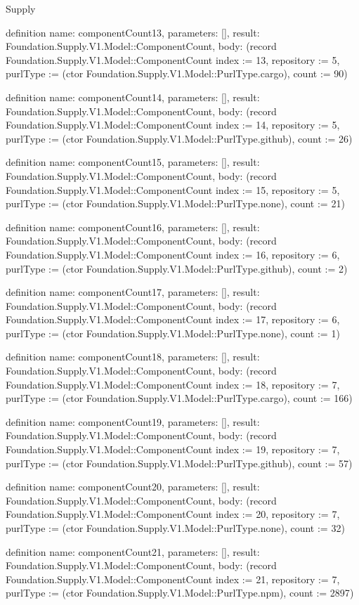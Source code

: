 \begin{lexlean}{Supply}
\begin{semanticmodule}
definition{
  name: componentCount13,
  parameters: [],
  result: Foundation.Supply.V1.Model::ComponentCount,
  body: (record Foundation.Supply.V1.Model::ComponentCount {index := 13, repository := 5, purlType := (ctor Foundation.Supply.V1.Model::PurlType.cargo), count := 90})
}

definition{
  name: componentCount14,
  parameters: [],
  result: Foundation.Supply.V1.Model::ComponentCount,
  body: (record Foundation.Supply.V1.Model::ComponentCount {index := 14, repository := 5, purlType := (ctor Foundation.Supply.V1.Model::PurlType.github), count := 26})
}

definition{
  name: componentCount15,
  parameters: [],
  result: Foundation.Supply.V1.Model::ComponentCount,
  body: (record Foundation.Supply.V1.Model::ComponentCount {index := 15, repository := 5, purlType := (ctor Foundation.Supply.V1.Model::PurlType.none), count := 21})
}

definition{
  name: componentCount16,
  parameters: [],
  result: Foundation.Supply.V1.Model::ComponentCount,
  body: (record Foundation.Supply.V1.Model::ComponentCount {index := 16, repository := 6, purlType := (ctor Foundation.Supply.V1.Model::PurlType.github), count := 2})
}

definition{
  name: componentCount17,
  parameters: [],
  result: Foundation.Supply.V1.Model::ComponentCount,
  body: (record Foundation.Supply.V1.Model::ComponentCount {index := 17, repository := 6, purlType := (ctor Foundation.Supply.V1.Model::PurlType.none), count := 1})
}

definition{
  name: componentCount18,
  parameters: [],
  result: Foundation.Supply.V1.Model::ComponentCount,
  body: (record Foundation.Supply.V1.Model::ComponentCount {index := 18, repository := 7, purlType := (ctor Foundation.Supply.V1.Model::PurlType.cargo), count := 166})
}

definition{
  name: componentCount19,
  parameters: [],
  result: Foundation.Supply.V1.Model::ComponentCount,
  body: (record Foundation.Supply.V1.Model::ComponentCount {index := 19, repository := 7, purlType := (ctor Foundation.Supply.V1.Model::PurlType.github), count := 57})
}

definition{
  name: componentCount20,
  parameters: [],
  result: Foundation.Supply.V1.Model::ComponentCount,
  body: (record Foundation.Supply.V1.Model::ComponentCount {index := 20, repository := 7, purlType := (ctor Foundation.Supply.V1.Model::PurlType.none), count := 32})
}

definition{
  name: componentCount21,
  parameters: [],
  result: Foundation.Supply.V1.Model::ComponentCount,
  body: (record Foundation.Supply.V1.Model::ComponentCount {index := 21, repository := 7, purlType := (ctor Foundation.Supply.V1.Model::PurlType.npm), count := 2897})
}


\end{semanticmodule}
\end{lexlean}

